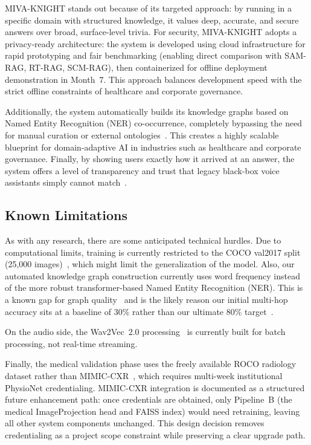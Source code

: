 \documentclass[12pt, a4paper]{article}
\begin{document}
MIVA-KNIGHT stands out because of its targeted approach: by running in a
specific domain with structured knowledge, it values deep, accurate, and secure
answers over broad, surface-level trivia. For security, MIVA-KNIGHT adopts a
privacy-ready architecture: the system is developed using cloud infrastructure
for rapid prototyping and fair benchmarking (enabling direct comparison with
SAM-RAG, RT-RAG, SCM-RAG), then containerized for offline deployment
demonstration in Month~7. This approach balances development speed with the
strict offline constraints of healthcare and corporate governance.

Additionally, the system automatically builds its knowledge graphs based on
Named Entity Recognition (NER) co-occurrence, completely bypassing the need for
manual curation or external
ontologies~\cite{pan2024unifying}. This creates a highly scalable blueprint for
domain-adaptive AI in industries such as healthcare and corporate governance.
Finally, by showing users exactly how it arrived at an answer, the system offers
a level of transparency and trust that legacy black-box voice assistants simply
cannot match~\cite{kadam2022multimodal}.

\subsection{Known Limitations}

As with any research, there are some anticipated technical hurdles. Due to
computational limits, training is currently restricted to the COCO val2017
split (25,000 images)~\cite{lin2014microsoft}, which might limit the
generalization of the model. Also, our automated knowledge graph construction
currently uses word frequency instead of the more robust transformer-based Named
Entity Recognition (NER). This is a known gap for graph
quality~\cite{pan2024unifying} and is the likely reason our initial multi-hop
accuracy sits at a baseline of 30\% rather than our ultimate 80\%
target~\cite{sarmah2024hybridrag}.

On the audio side, the Wav2Vec~2.0 processing~\cite{baevski2020wav2vec} is
currently built for batch processing, not real-time streaming.

Finally, the medical validation phase uses the freely available ROCO radiology
dataset rather than MIMIC-CXR~\cite{johnson2019mimic}, which requires
multi-week institutional PhysioNet credentialing. MIMIC-CXR integration is
documented as a structured future enhancement path: once credentials are
obtained, only Pipeline~B (the medical ImageProjection head and FAISS index)
would need retraining, leaving all other system components unchanged. This
design decision removes credentialing as a project scope constraint while
preserving a clear upgrade path.
\end{document}
